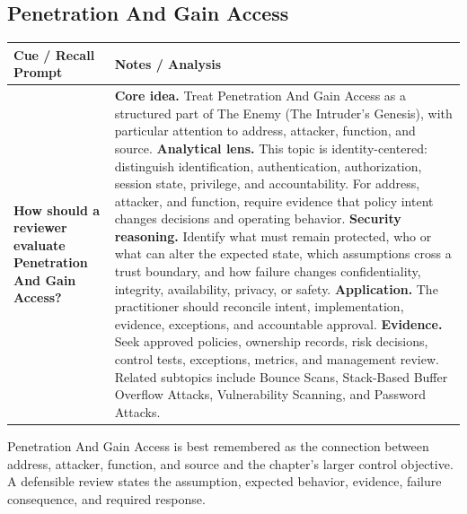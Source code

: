 \documentclass[11pt]{article}
\newcommand{\CornellHeader}{%
\rowcolor{Navy}\color{white}\bfseries Cue / Recall Prompt & \color{white}\bfseries Notes / Analysis\\\hline}
\newcommand{\CornellRow}[2]{%
\cellcolor{CueGray}\RaggedRight\textbf{#1} & \RaggedRight #2\\\hline}
\begin{document}
\subsection*{Penetration And Gain Access}
\begin{longtable}{>{\RaggedRight\arraybackslash}p{}|>{\RaggedRight\arraybackslash}p{}}
\CornellHeader
\CornellRow{How should a reviewer evaluate Penetration And Gain Access?}{\textbf{Core idea.} Treat Penetration And Gain Access as a structured part of The Enemy (The Intruder's Genesis), with particular attention to address, attacker, function, and source. \textbf{Analytical lens.} This topic is identity-centered: distinguish identification, authentication, authorization, session state, privilege, and accountability. For address, attacker, and function, require evidence that policy intent changes decisions and operating behavior. \textbf{Security reasoning.} Identify what must remain protected, who or what can alter the expected state, which assumptions cross a trust boundary, and how failure changes confidentiality, integrity, availability, privacy, or safety. \textbf{Application.} The practitioner should reconcile intent, implementation, evidence, exceptions, and accountable approval. \textbf{Evidence.} Seek approved policies, ownership records, risk decisions, control tests, exceptions, metrics, and management review. Related subtopics include Bounce Scans, Stack-Based Buffer Overflow Attacks, Vulnerability Scanning, and Password Attacks.}
\end{longtable}
\begin{topicsummary}
Penetration And Gain Access is best remembered as the connection between address, attacker, function, and source and the chapter's larger control objective. A defensible review states the assumption, expected behavior, evidence, failure consequence, and required response.
\end{topicsummary}
\end{document}
